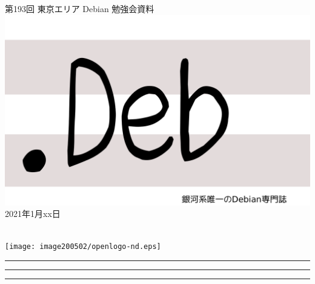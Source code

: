 \documentclass[mingoth,a4paper]{jsarticle}
\newcommand{\debmtgyear}{2021}
\newcommand{\debmtgmonth}{1}
\newcommand{\debmtgdate}{xx}
\newcommand{\debmtgnumber}{193}
\begin{document}
\begin{titlepage}
\thispagestyle{empty}

\vspace*{-2cm}
第\debmtgnumber{}回 東京エリア Debian 勉強会資料\\
\hspace*{-2cm}
\includegraphics{image2012-natsu/dotdeb.pdf}\\
\hfill{}\debmtgyear{}年\debmtgmonth{}月\debmtgdate{}日

\\

\vspace*{-2cm}
\hfill{}\texttt{[image: image200502/openlogo-nd.eps]}
\end{titlepage}

\newpage

\begin{minipage}[b]{0.2\hsize}
 \colorbox{titleback}{}
\end{minipage}
\begin{minipage}[b]{0.8\hsize}
\hrule
\vspace{2mm}
\hrule
\begin{multicols}{2}
\tableofcontents
\end{multicols}
\vspace{2mm}
\hrule
\end{minipage}

\end{document}

